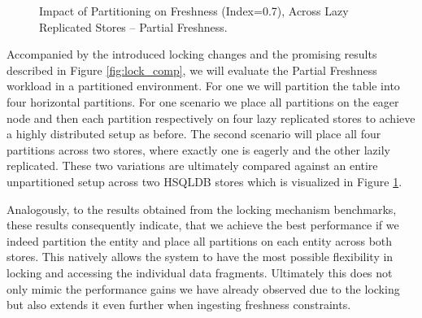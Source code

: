 \begin{figure}[t] 
    \centering 
    \caption{Impact of Partitioning on Freshness (Index=0.7), Across Lazy Replicated Stores -- Partial Freshness.}
    \label{fig:partition_result}
\end{figure}

Accompanied by the introduced locking changes and the promising results described in Figure \ref{fig:lock_comp}, we will evaluate the Partial Freshness workload in 
a partitioned environment. For one we will partition the table into four horizontal partitions. 
For one scenario we place all partitions on the eager node and then each partition respectively on four lazy replicated stores to achieve a highly distributed setup as before.
The second scenario will place all four partitions across two stores, where exactly one is eagerly and the other lazily replicated. 
These two variations are ultimately compared against an entire unpartitioned setup across two HSQLDB stores which is visualized in Figure \ref{fig:partition_result}.


Analogously, to the results obtained from the locking mechanism benchmarks, 
these results consequently indicate, that we achieve the best performance
if we indeed partition the entity and place all partitions on each entity across both stores. This natively allows the system to have the most possible 
flexibility in locking and accessing the individual data fragments. 
Ultimately this does not only mimic the performance gains we have already observed due to the locking 
but also extends it even further when ingesting freshness constraints.\\





